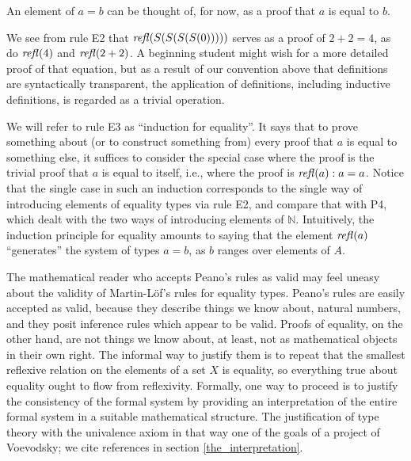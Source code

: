 \documentclass[letter,12pt]{amsart}
\theoremstyle{definition}
\theoremstyle{remark}
\numberwithin{equation}{section}
\newcommand{\refl}{\mathop{{\it refl}}}
\newcommand{\NN}{\mathbb{N}}
\begin{document}
An element of $a=b$ can be thought of, for now, as a proof that $a$ is equal to $b$.

We see from rule E2 that $\refl(S(S(S(S(0)))))$ serves as a proof of $2+2=4$, as do $\refl(4)$ and $\refl(2+2)$.  A beginning student might wish
for a more detailed proof of that equation, but as a result of our convention above that definitions are syntactically transparent, the
application of definitions, including inductive definitions, is regarded as a trivial operation.

We will refer to rule E3 as ``induction for equality''.  It says that to prove something about (or to construct something from) every proof that
$a$ is equal to something else, it suffices to consider the special case where the proof is the trivial proof that $a$ is equal to itself, i.e.,
where the proof is $\refl(a) : a=a$.  Notice that the single case in such an induction corresponds to the single way of introducing elements of
equality types via rule E2, and compare that with P4, which dealt with the two ways of introducing elements of $\NN$.
Intuitively, the induction principle for equality amounts to saying that the element $\refl(a)$ ``generates'' the system of types $a=b$, as $b$
ranges over elements of $A$.

The mathematical reader who accepts Peano's rules as valid may feel uneasy about the validity of Martin-L\"of's rules for equality types.
Peano's rules are easily accepted as valid, because they describe things we know about, natural numbers, and they posit inference rules which
appear to be valid.  Proofs of equality, on the other hand, are not things we know about, at least, not as mathematical objects in their own
right.  The informal way to justify them is to repeat that the smallest reflexive relation on the elements of a set $X$ is equality, so
everything true about equality ought to flow from reflexivity.  Formally, one way to proceed is to justify the consistency of the formal system
by providing an interpretation of the entire formal system in a suitable mathematical structure.  The justification of type theory with the
univalence axiom in that way one of the goals of a project of Voevodsky; we cite references in section \ref{the_interpretation}.
\end{document}
